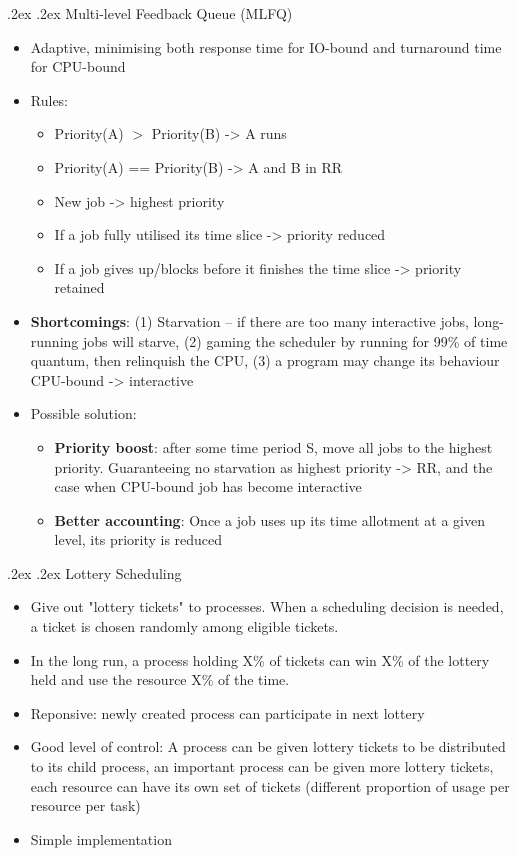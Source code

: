 \documentclass[10pt,landscape,a4paper]{article}
\makeatletter
\renewcommand{\subsubsection}{\@startsection{subsubsection}{1}{0mm}%
  {.2ex}%
  {.2ex}%
{\rmfamily\bfseries}}
\makeatother
\begin{document}
\begin{multicols*}{4}
  \subsubsection{Multi-level Feedback Queue (MLFQ)}
  \begin{itemize}
    \item Adaptive, minimising both response time for IO-bound and turnaround time for CPU-bound
    \item Rules:
          \begin{itemize}
            \item Priority(A) $>$ Priority(B) -> A runs
            \item Priority(A) == Priority(B) -> A and B in RR
            \item New job -> highest priority
            \item If a job fully utilised its time slice -> priority reduced
            \item If a job gives up/blocks before it finishes the time slice -> priority retained
          \end{itemize}
    \item \textbf{Shortcomings}: (1) Starvation -- if there are too many interactive jobs, long-running jobs will starve, (2) gaming the scheduler by running for 99\% of time quantum, then relinquish the CPU, (3) a program may change its behaviour CPU-bound -> interactive
    \item Possible solution:
          \begin{itemize}
            \item \textbf{Priority boost}: after some time period S, move all jobs to the highest priority. Guaranteeing no starvation as highest priority -> RR, and the case when CPU-bound job has become interactive
            \item \textbf{Better accounting}: Once a job uses up its time allotment at a given level, its priority is reduced
          \end{itemize}
  \end{itemize}
  \subsubsection{Lottery Scheduling}
  \begin{itemize}
    \item Give out "lottery tickets" to processes. When a scheduling decision is needed, a ticket is chosen randomly among eligible tickets.
    \item In the long run, a process holding X\% of tickets can win X\% of the lottery held and use the resource X\% of the time.
    \item Reponsive: newly created process can participate in next lottery
    \item Good level of control: A process can be given lottery tickets to be distributed to its child process, an important process can be given more lottery tickets, each resource can have its own set of tickets (different proportion of usage per resource per task)
    \item Simple implementation
  \end{itemize}


\end{multicols*}
\end{document}
